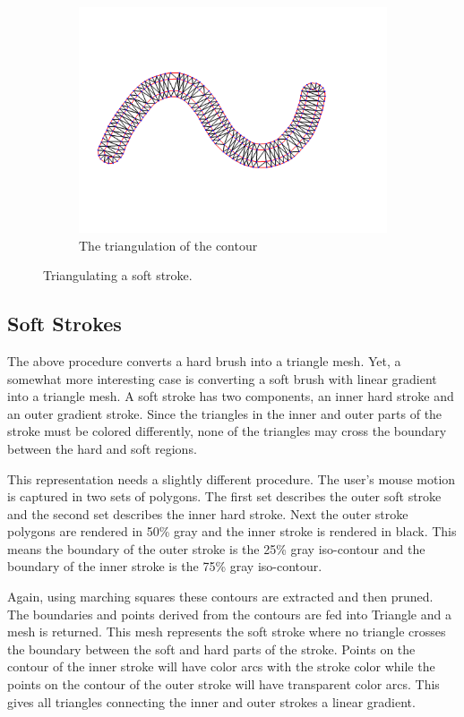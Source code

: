 \documentclass[review]{acmsiggraph}
\begin{document}
\begin{figure}
\begin{subfigure}[b]{0.3\textwidth}
  \centering
  \includegraphics[width=.9\textwidth]{images/stroke_triangulation/softmesh}
  \caption{The triangulation of the contour}
  \label{fig:sub2}
\end{subfigure}
\caption{Triangulating a soft stroke.}
\label{fig:test}
\end{figure}



\subsection{Soft Strokes}
The above procedure converts a hard brush into a triangle mesh. Yet, a somewhat more interesting
case is converting a soft brush with linear gradient into a triangle mesh. A soft stroke has two
components, an inner hard stroke and an outer gradient stroke. Since the triangles in the inner and
outer parts of the stroke must be colored differently, none of the triangles may cross the boundary
between the hard and soft regions.

This representation needs a slightly different procedure. The user's mouse motion
is captured in two sets of polygons. The first set describes the outer soft stroke and the second set describes
the inner hard stroke. Next the outer stroke polygons are rendered in 50\% gray and the inner stroke
is rendered in black. This means the boundary of the outer stroke is the 25\% gray iso-contour and the
boundary of the inner stroke is the 75\% gray iso-contour.

Again, using marching squares these contours are extracted and then pruned. The boundaries and points
derived from the contours are fed into Triangle and a mesh is returned. This mesh represents the soft
stroke where no triangle crosses the boundary between the soft and hard parts
of the stroke. Points on the contour of the inner stroke will have color arcs with the stroke color
while the points on the contour of the outer stroke will have transparent color arcs. This gives
all triangles connecting the inner and outer strokes a linear gradient.
\end{document}
